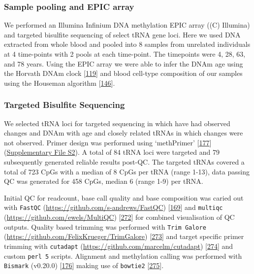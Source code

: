 \documentclass[
]{book}
\begin{document}
\hypertarget{sample-pooling-and-epic-array}{%
\subsubsection{Sample pooling and EPIC array}\label{sample-pooling-and-epic-array}}

We performed an Illumina Infinium DNA methylation EPIC array ((C) Illumina) and targeted bisulfite sequencing of select tRNA gene loci.
Here we used DNA extracted from whole blood and pooled into 8 samples from unrelated individuals at 4 time-points with 2 pools at each time-point.
The timepoints were 4, 28, 63, and 78 years.
Using the EPIC array we were able to infer the DNAm age using the Horvath DNAm clock {[}\protect\hyperlink{ref-Horvath2013}{119}{]} and blood cell-type composition of our samples using the Houseman algorithm {[}\protect\hyperlink{ref-Houseman2012}{146}{]}.

\hypertarget{targetedBiSseq}{%
\subsubsection{Targeted Bisulfite Sequencing}\label{targetedBiSseq}}

We selected tRNA loci for targeted sequencing in which have had observed changes and DNAm with age and closely related tRNAs in which changes were not observed.
Primer design was performed using `methPrimer' {[}\protect\hyperlink{ref-Li2002}{177}{]} (\href{./Supplementary_Files/Targeted_BiS-seq_Primers.txt}{Supplementary File S2}).
A total of 84 tRNA loci were targeted and 79 subsequently generated reliable results post-QC.
The targeted tRNAs covered a total of 723 CpGs with a median of 8 CpGs per tRNA (range 1-13), data passing QC was generated for 458 CpGs, median 6 (range 1-9) per tRNA.

Initial QC for readcount, base call quality and base composition was caried out with \texttt{FastQC} (\url{https://github.com/s-andrews/FastQC}) {[}\protect\hyperlink{ref-Andrews2010}{169}{]} and \texttt{multiqc} (\url{https://github.com/ewels/MultiQC}) {[}\protect\hyperlink{ref-Ewels2016}{272}{]} for combined visualisation of QC outputs.
Quality based trimming was performed with \texttt{Trim\ Galore} (\url{https://github.com/FelixKrueger/TrimGalore}) {[}\protect\hyperlink{ref-Krueger2015}{273}{]} and target specific primer trimming with \texttt{cutadapt} (\url{https://github.com/marcelm/cutadapt}) {[}\protect\hyperlink{ref-Martin2011}{274}{]} and custom \texttt{perl\ 5} scripts.
Alignment and methylation calling was performed with \texttt{Bismark} (v0.20.0) {[}\protect\hyperlink{ref-Krueger2011}{176}{]} making use of \texttt{bowtie2} {[}\protect\hyperlink{ref-Langmead2012}{275}{]}.
\end{document}
